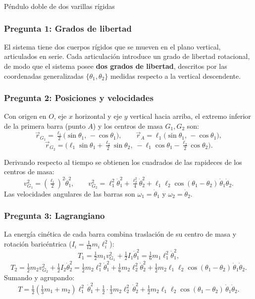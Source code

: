 \begin{solucion}{Péndulo doble de dos varillas rígidas}
\subsubsection*{Pregunta 1: Grados de libertad}

El sistema tiene dos cuerpos rígidos que se mueven en el plano vertical, articulados en
serie. Cada articulación introduce un grado de libertad rotacional, de modo que el sistema
posee \textbf{dos grados de libertad}, descritos por las coordenadas generalizadas
$\{\theta_1,\theta_2\}$ medidas respecto a la vertical descendente.

\subsubsection*{Pregunta 2: Posiciones y velocidades}

Con origen en $O$, eje $x$ horizontal y eje $y$ vertical hacia arriba, el extremo inferior
de la primera barra (punto $A$) y los centros de masa $G_1,G_2$ son:
$$\vec{r}_{G_1} = \tfrac{\ell_1}{2}\big(\sin\theta_1,\,-\cos\theta_1\big),\qquad
\vec{r}_{A} = \ell_1\big(\sin\theta_1,\,-\cos\theta_1\big),$$
$$\vec{r}_{G_2} = \Big(\ell_1\sin\theta_1 + \tfrac{\ell_2}{2}\sin\theta_2,\;
-\ell_1\cos\theta_1 - \tfrac{\ell_2}{2}\cos\theta_2\Big).$$

Derivando respecto al tiempo se obtienen los cuadrados de las rapideces de los centros de
masa:
$$v_{G_1}^2 = \left(\tfrac{\ell_1}{2}\right)^2\dot\theta_1^2,\qquad
v_{G_2}^2 = \ell_1^2\dot\theta_1^2 + \tfrac{\ell_2^2}{4}\dot\theta_2^2
+ \ell_1\ell_2\cos(\theta_1-\theta_2)\,\dot\theta_1\dot\theta_2.$$
Las velocidades angulares de las barras son $\omega_1=\dot\theta_1$ y $\omega_2=\dot\theta_2$.

\subsubsection*{Pregunta 3: Lagrangiano}

La energía cinética de cada barra combina traslación de su centro de masa y rotación
baricéntrica ($I_i=\tfrac{1}{12}m_i\ell_i^2$):
$$T_1 = \tfrac12 m_1 v_{G_1}^2 + \tfrac12 I_1\dot\theta_1^2 = \tfrac16 m_1\ell_1^2\dot\theta_1^2,$$
$$T_2 = \tfrac12 m_2 v_{G_2}^2 + \tfrac12 I_2\dot\theta_2^2
= \tfrac12 m_2\ell_1^2\dot\theta_1^2 + \tfrac16 m_2\ell_2^2\dot\theta_2^2
+ \tfrac12 m_2\ell_1\ell_2\cos(\theta_1-\theta_2)\,\dot\theta_1\dot\theta_2.$$
Sumando y agrupando:
$$T = \tfrac12\left(\tfrac13 m_1 + m_2\right)\ell_1^2\,\dot\theta_1^2
+ \tfrac12\cdot\tfrac13 m_2\ell_2^2\,\dot\theta_2^2
+ \tfrac12 m_2\ell_1\ell_2\cos(\theta_1-\theta_2)\,\dot\theta_1\dot\theta_2.$$


\end{solucion}
